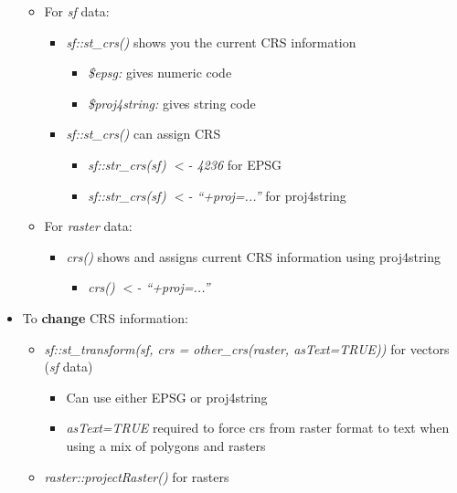 \documentclass{article}
\begin{document}
\begin{itemize}
    \begin{itemize}
        \item For \textit{sf} data:
        \begin{itemize}
            \item \textit{sf::st\_crs()} shows you the current CRS information
            \begin{itemize}
                \item \textit{\$epsg:} gives numeric code
                \item \textit{\$proj4string:} gives string code
            \end{itemize}
            \item \textit{sf::st\_crs()} can assign CRS
            \begin{itemize}
                \item \textit{sf::str\_crs(sf) $<$- 4236} for EPSG
                \item \textit{sf::str\_crs(sf) $<$- ``+proj=...''} for proj4string
            \end{itemize}
        \end{itemize}
        \item For \textit{raster} data:
        \begin{itemize}
            \item \textit{crs()} shows and assigns current CRS information using proj4string
            \begin{itemize}
                \item \textit{crs() $<$- ``+proj=...''}
            \end{itemize} 
        \end{itemize}
    \end{itemize}
    \item To \textbf{change} CRS information:
    \begin{itemize}
        \item \textit{sf::st\_transform(sf, crs = other\_crs(raster, asText=TRUE))} for vectors (\textit{sf} data)
        \begin{itemize}
            \item Can use either EPSG or proj4string
            \item \textit{asText=TRUE} required to force crs from raster format to text when using a mix of polygons and rasters
        \end{itemize}
        \item \textit{raster::projectRaster()} for rasters
        \begin{itemize}

\end{itemize}
\end{itemize}
\end{itemize}
\end{document}
